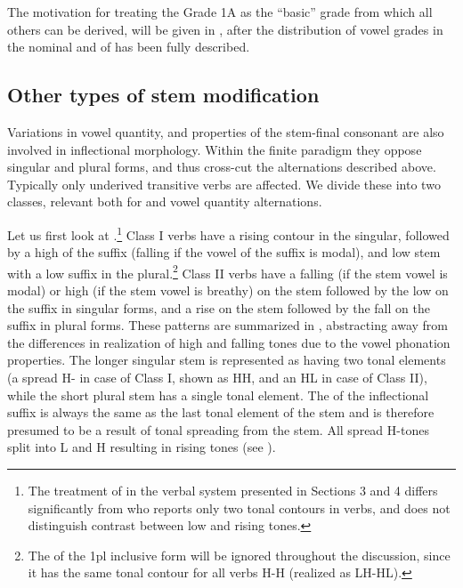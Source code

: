 \documentclass[output=paper,newtxmath,modfonts,nonflat,draftmode]{langsci/langscibook}
\begin{document}
\largerpage
The motivation for treating the Grade 1A as the “basic” grade from which all others can be derived, will be given in , after the distribution of vowel grades in the nominal and  of  has been fully described.

\subsection{Other types of stem modification} %
\label{sec:monich:3.3}

Variations in vowel quantity,  and properties of the stem-final consonant are also involved in inflectional morphology. Within the finite paradigm they oppose singular and plural forms, and thus cross-cut the  alternations described above. Typically only underived transitive verbs are affected. We divide these into two classes, relevant both for  and vowel quantity alternations. 

Let us first look at .\footnote{The\label{fn:monich:6} treatment of  in the verbal system presented in Sections 3 and 4 differs significantly from \citet{gjersøe2017} who reports only two tonal contours in verbs, and does not distinguish contrast between low and rising tones.} Class I verbs have a rising contour in the singular, followed by a high  of the suffix (falling if the vowel of the suffix is modal), and low stem with a low suffix in the plural.\footnote{The \label{fn:monich:7} of the 1pl inclusive form will be ignored throughout the discussion, since it has the same tonal contour for all verbs H-H (realized as LH-HL).} Class II verbs have a falling  (if the stem vowel is modal) or high (if the stem vowel is breathy)  on the stem followed by the low  on the suffix in singular forms, and a rise on the stem followed by the fall on the suffix in plural forms. These patterns are summarized in , abstracting away from the differences in realization of high and falling tones due to the vowel phonation properties. The longer singular stem is represented as having two tonal elements (a spread H- in case of Class I, shown as HH, and an HL in case of Class II), while the short plural stem has a single tonal element. The  of the inflectional suffix is always the same as the last tonal element of the stem and is therefore presumed to be a result of tonal spreading from the stem. All spread H-tones split into L and H resulting in rising tones (see ). 
\end{document}
